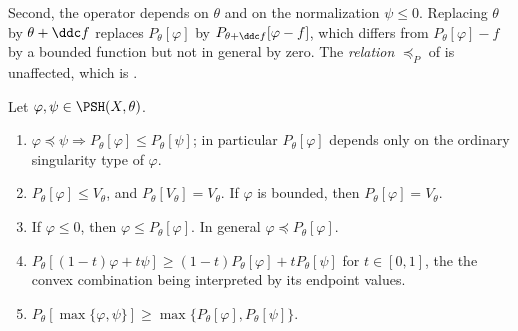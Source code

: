 Second, the operator depends on $\theta$ and on the normalization
$\psi\leq0$.  Replacing $\theta$ by $\theta+\ddc f$ replaces
$P_\theta[\varphi]$ by $P_{\theta+\ddc f}[\varphi-f]$, which differs
from $P_\theta[\varphi]-f$ by a bounded function but not in general by
zero.  The \emph{relation} $\preceq_P$ of
 is unaffected, which is
.

\begin{proposition}
\label{prop:ch51-p-elementary}
Let $\varphi,\psi\in\PSH(X,\theta)$.
\begin{enumerate}
\item\label{itm:ch51-pe:monotone}
      $\varphi\preceq\psi\Rightarrow
      P_\theta[\varphi]\leq P_\theta[\psi]$; in particular
      $P_\theta[\varphi]$ depends only on the ordinary singularity type
      of $\varphi$.
\item\label{itm:ch51-pe:normalize}
      $P_\theta[\varphi]\leq V_\theta$, and
      $P_\theta[V_\theta]=V_\theta$.  If $\varphi$ is bounded, then
      $P_\theta[\varphi]=V_\theta$.
\item\label{itm:ch51-pe:above}
      If $\varphi\leq0$, then $\varphi\leq P_\theta[\varphi]$.  In
      general $\varphi\preceq P_\theta[\varphi]$.
\item\label{itm:ch51-pe:concave}
      $P_\theta[(1-t)\varphi+t\psi]\geq
      (1-t)P_\theta[\varphi]+tP_\theta[\psi]$ for $t\in[0,1]$, the
      the convex combination being interpreted by its endpoint values.
\item\label{itm:ch51-pe:max}
      $P_\theta[\max\{\varphi,\psi\}]
      \geq\max\{P_\theta[\varphi],P_\theta[\psi]\}$.
\end{enumerate}
\end{proposition}

